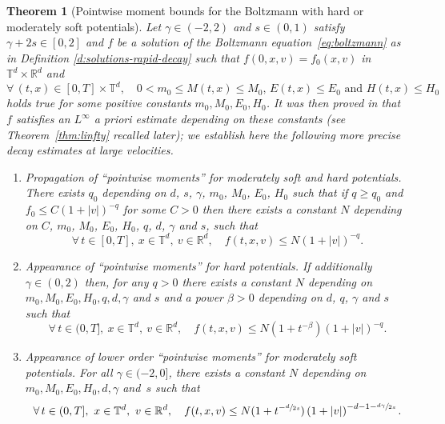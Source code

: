 \documentclass[11pt]{article}
\theoremstyle{plain}
\newtheorem{thm}{Theorem}[section]
\theoremstyle{definition}
\numberwithin{equation}{section}
\newcommand{\R}{\mathbb R}
\let\A N
\begin{document}
\begin{thm}[Pointwise moment bounds for the Boltzmann with hard or
moderately soft potentials]\label{thm:upper}
Let $\gamma \in (-2,2)$ and $s \in (0,1)$ satisfy
$\gamma +2s \in [0,2]$ and $f$ be a solution of the Boltzmann
equation~\eqref{eq:boltzmann} as in Definition
\ref{d:solutions-rapid-decay} such that $f(0,x,v)=f_0(x,v)$ in $\mathbb{T}^d \times \R^d$ and
\begin{equation}\label{eq:non-deg}
\forall \, (t,x) \in [0,T] \times \mathbb T^d, \quad 0\!<\!m_0\!\le\! M(t,x)\!\le\! M_0, \,
E(t,x)\!\le\! E_0 \text{ and } H(t,x)\!\le\! H_0
\end{equation}
holds true for some positive constants $m_0,M_0,E_0,H_0$. It was then
proved in \cite{luis} that~$f$ satisfies an $L^\infty$ a priori
estimate depending on these constants (see Theorem~\ref{thm:linfty}
recalled later); we establish here the following more precise decay
estimates at large velocities.
\begin{enumerate}
\item \label{i:3} \emph{Propagation of ``pointwise moments'' for
moderately soft and hard potentials.} There exists $q_0$ depending
on $d$, $s$, $\gamma$, $m_0$, $M_0$, $E_0$, $H_0$ such that if
$q \ge q_0$ and $f_0 \le C (1 + |v|)^{-q}$ for some $C>0$ then
there exists a constant $\A$ depending on $C$, $m_0$, $M_0$, $E_0$,
$H_0$, $q$, $d$, $\gamma$ and $s$, such that
\[
\forall \, t \in [0,T], \ x \in \mathbb{T}^d, \ v \in \R^d, \quad
f (t,x,v) \le \A \left(1+|v|\right)^{-q}.
\]

\item \label{i:2} \emph{Appearance of ``pointwise moments'' for hard
potentials.} If additionally $\gamma \in (0,2)$ then, for any
$q>0$ there exists a constant $\A$ depending on
$m_0,M_0,E_0, H_0, q, d, \gamma$ and $s$ and a power $\beta>0$
depending on $d$, $q$, $\gamma$ and $s$ such that
\[
\forall \, t \in (0,T], \ x \in \mathbb{T}^d, \ v \in \R^d, \quad
f(t,x,v) \le \A\left(1+t^{-\beta}\right) \left(1 + |v|\right)^{-q}.
\]

\item \label{i:1} \emph{Appearance of lower order ``pointwise
moments'' for moderately soft potentials.} For all
$\gamma \in (-2,0]$, there exists a constant $\A$ depending on
$m_0,M_0,E_0, H_0, d, \gamma$ and~$s$ such that
\[
\forall \, t \in (0,T], \ x \in \mathbb{T}^d, \ v \in \R^d, \quad
f(t,x,v) \le \A(1+t^{-\sfrac{d}{2s}}) \left( 1 +
|v|\right)^{-d-1-\sfrac{d \gamma}{2s}}.
\]
\end{enumerate}
\end{thm}
\end{document}
